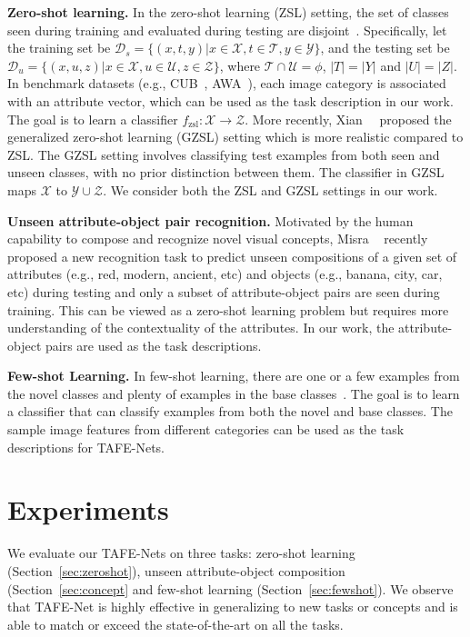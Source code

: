 \documentclass[10pt,twocolumn,letterpaper]{article}
\newcommand{\modelplural}{TAFE-Nets\xspace}
\newcommand\minisection[1]{\vspace{2mm}\noindent \textbf{#1}}
\begin{document}
\minisection{Zero-shot learning.} In the zero-shot learning (ZSL) setting, the set of classes seen during 
training and evaluated during testing are disjoint~\cite{lampert2014attribute,akata2016label}. Specifically,
let the training set be $\mathcal{D}_s = \{(x, t, y)|x\in\mathcal{X}, t\in\mathcal{T}, y\in\mathcal{Y}\}$, and 
the testing set be $\mathcal{D}_u = \{(x, u, z)|x\in\mathcal{X}, u\in\mathcal{U}, z\in\mathcal{Z}\}$, where $\mathcal{T}\cap\mathcal{U}=\phi$, $|T|=|Y|$ and $|U|=|Z|$.  In benchmark datasets (e.g., CUB~\cite{WelinderEtal2010}, AWA~\cite{lampert2009learning}), each image category 
is associated with an attribute vector, which can be used as the task description in our work.
The goal is to learn a classifier $f_\text{zsl}: \mathcal{X}\rightarrow \mathcal{Z}$. More recently,
Xian~\etal~\cite{xian2018zero} proposed the generalized zero-shot learning (GZSL) setting which is more realistic compared to ZSL. The GZSL setting involves classifying test examples from
both seen and unseen classes, with no prior distinction between them. The classifier in GZSL maps $\mathcal{X}$
to $\mathcal{Y}\cup\mathcal{Z}$. We consider both the ZSL and GZSL settings in our work. 

\minisection{Unseen attribute-object pair recognition.} Motivated by the human capability to compose and recognize
novel visual concepts, Misra \etal~\cite{misra2017red} recently 
proposed a new recognition task to predict unseen compositions of a given set of attributes (e.g., red, modern, ancient, etc) and objects (e.g., banana, city, car, etc) during 
testing and only a subset of attribute-object pairs are seen during training. This can be viewed as a zero-shot 
learning problem but requires more understanding of the contextuality of the attributes. In our work, the 
attribute-object pairs are used as the task descriptions. 

\minisection{Few-shot Learning.} 
In few-shot learning, there are one or a few examples from the novel classes and plenty of examples in the base classes~\cite{hariharan2017low}. 
The goal is to learn a classifier that can classify examples from both the novel and base classes. The sample
image features from different categories can be used as the task descriptions for \modelplural. 





 	\newcommand{\controlmodel}{controller\xspace}
\newcommand{\controlmodelplural}{controllers\xspace}
\section{Experiments}
\label{sec:exp}
We evaluate our \modelplural on three tasks: zero-shot learning (Section~\ref{sec:zeroshot}), unseen
attribute-object composition (Section~\ref{sec:concept} and few-shot learning (Section~\ref{sec:fewshot}). We observe that TAFE-Net is highly effective in generalizing to new tasks or concepts and is able to match or exceed the state-of-the-art on all the tasks. 
\end{document}
